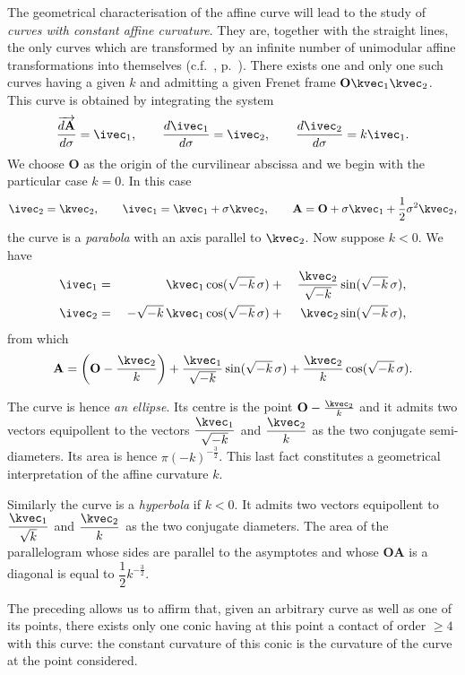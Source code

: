 The geometrical characterisation of the affine curve will lead to the study of \emph{curves with constant affine curvature}. They are, together with the straight lines, the only curves which are transformed by an infinite number of unimodular affine transformations into themselves (c.f.~, p.~\pageref{sec:132}). There exists one and only one such curves having a given $k$ and admitting a given Frenet frame $\mathbf{O}\kvec_{1}\kvec_{2}$. This curve is obtained by integrating the system
\[
\frac{\overrightarrow{d\mathbf{A}}}{d\sigma}=\ivec_{1},\qquad\frac{d\ivec_{1}}{d\sigma}=\ivec_{2},\qquad\frac{d\ivec_{2}}{d\sigma}=k\ivec_{1}.
\]
We choose $\mathbf{O}$ as the origin of the curvilinear abscissa and we begin with the particular case $k=0$. In this case
\[
\ivec_{2}=\kvec_{2},\qquad\ivec_{1}=\kvec_{1}+\sigma\kvec_{2},\qquad\mathbf{A}=\mathbf{O}+\sigma\kvec_{1}+\frac{1}{2}\sigma^{2}\kvec_{2},
\]
the curve is a \emph{parabola} with an axis parallel to $\kvec_{2}$. Now suppose $k<0$. We have
\begin{alignat*}{10}
  \ivec_{1}&=&\kvec_{1}&\cos(\sqrt{-k}\,\sigma){}+{}&\frac{\kvec_{2}}{\sqrt{-k}}&\sin(\sqrt{-k}\,\sigma),\\
  \ivec_{2}&{}={}&-\sqrt{-k}\,\kvec_{1}&\cos(\sqrt{-k}\,\sigma){}+{}&\kvec_{2}&\sin(\sqrt{-k}\,\sigma),
\end{alignat*}
from which
\[
\mathbf{A}=\left(\mathbf{O}-\frac{\kvec_{2}}{k}\right)+\frac{\kvec_{1}}{\sqrt{-k}}\sin(\sqrt{-k}\,\sigma)+\frac{\kvec_{2}}{k}\cos(\sqrt{-k}\,\sigma).
\]

The curve is hence \emph{an ellipse}. Its centre is the point $\mathbf{O}-\frac{\kvec_{2}}{k}$ and it admits two vectors equipollent to the vectors $\dfrac{\kvec_{1}}{\sqrt{-k}}$ and $\dfrac{\kvec_{2}}{k}$ as the two conjugate semi-diameters. Its area is hence $\pi(-k)^{-\frac{3}{2}}$. This last fact constitutes a geometrical interpretation of the affine curvature $k$.

Similarly the curve is a \emph{hyperbola} if $k<0$. It admits two vectors equipollent to $\dfrac{\kvec_{1}}{\sqrt{k}}$ and $\dfrac{\kvec_{2}}{k}$ as the two conjugate diameters. The area of the parallelogram whose sides are parallel to the asymptotes and whose $\mathbf{OA}$ is a diagonal is equal to $\dfrac{1}{2}k^{-\frac{3}{2}}$.

The preceding allows us to affirm that, given an arbitrary curve as well as one of its points, there exists only one conic having at this point a contact of order $\ge 4$ with this curve: the constant curvature of this conic is the curvature of the curve at the point considered.

